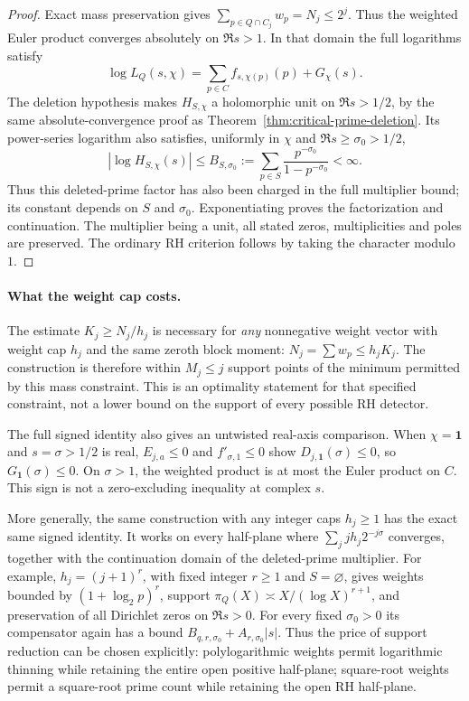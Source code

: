 \documentclass[11pt]{article}
\theoremstyle{definition}
\begin{document}
\begin{proof}
Exact mass preservation gives
$\sum_{p\in Q\cap C_j}w_p=N_j\le2^j$.
Thus the weighted Euler product converges absolutely on
$\Re s>1$. In that domain the full logarithms satisfy
\[
 \log L_Q(s,\chi)
 =\sum_{p\in C}f_{s,\chi(p)}(p)+G_\chi(s).
\]
The deletion hypothesis makes $H_{S,\chi}$ a holomorphic
unit on $\Re s>1/2$, by the same absolute-convergence proof
as Theorem~\ref{thm:critical-prime-deletion}.
Its power-series logarithm also satisfies, uniformly in $\chi$
and $\Re s\ge\sigma_0>1/2$,
\[
 |\log H_{S,\chi}(s)|
 \le B_{S,\sigma_0}:=
       \sum_{p\in S}\frac{p^{-\sigma_0}}{1-p^{-\sigma_0}}<\infty.
\]
Thus this deleted-prime factor has also been charged in the
full multiplier bound; its constant depends on $S$ and
$\sigma_0$.
Exponentiating proves the factorization and continuation.
The multiplier being a unit, all stated zeros, multiplicities
and poles are preserved. The ordinary RH criterion follows
by taking the character modulo $1$.
\end{proof}

\paragraph{What the weight cap costs.}
The estimate $K_j\ge N_j/h_j$ is necessary for
\emph{any} nonnegative weight vector with weight cap $h_j$
and the same zeroth block moment: $N_j=\sum w_p\le h_jK_j$.
The construction is therefore within $M_j\le j$ support
points of the minimum permitted by this mass constraint.
This is an optimality statement for that specified constraint,
not a lower bound on the support of every possible RH detector.

The full signed identity also gives an untwisted real-axis
comparison. When $\chi=\boldsymbol1$ and $s=\sigma>1/2$ is
real, $E_{j,a}\le0$ and $f'_{\sigma,1}\le0$ show
$D_{j,\boldsymbol1}(\sigma)\le0$, so
$G_{\boldsymbol1}(\sigma)\le0$.
On $\sigma>1$, the weighted product is at most the Euler
product on $C$. This sign is not a zero-excluding inequality
at complex $s$.

More generally, the same construction with any integer
caps $h_j\ge1$ has the exact same signed identity. It works
on every half-plane where
$\sum_j jh_j2^{-j\sigma}$ converges, together with the
continuation domain of the deleted-prime multiplier.
For example, $h_j=(j+1)^r$, with fixed integer $r\ge1$
and $S=\varnothing$, gives weights bounded by
$(1+\log_2p)^r$, support
$\pi_Q(X)\asymp X/(\log X)^{r+1}$, and preservation of all
Dirichlet zeros on $\Re s>0$.
For every fixed $\sigma_0>0$ its compensator again has
a bound $B_{q,r,\sigma_0}+A_{r,\sigma_0}|s|$.
Thus the price of support reduction can be chosen explicitly:
polylogarithmic weights permit logarithmic thinning while
retaining the entire open positive half-plane; square-root
weights permit a square-root prime count while retaining
the open RH half-plane.
\end{document}
